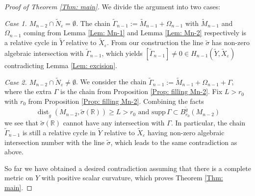 \documentclass[11pt,letterpaper]{amsart}
\numberwithin{equation}{section}
\theoremstyle{definition}
\DeclareMathOperator{\dist}{dist}
\newcommand{\ve}{\varepsilon}
\begin{document}
\begin{proof}[Proof of Theorem \ref{Thm: main}]
We divide the argument into two cases:

\medskip

{\it Case 1. $M_{n-2}\cap \tilde N_\ve=\emptyset$.} The chain $\tilde\Gamma_{n-1}:=\tilde M_{n-1}+\Omega_{n-1}$ with $\tilde M_{n-1}$ and $\Omega_{n-1}$ coming from Lemma \ref{Lem: Mn-1} and Lemma \ref{Lem: Mn-2} respectively is a relative cycle in $\tilde Y$ relative to $\tilde X_\ve$. From our construction the line $\tilde \sigma$ has non-zero algebraic intersection with $\tilde\Gamma_{n-1}$, which yields ${[\tilde\Gamma_{n-1}]}\neq 0\in H_{n-1}(\tilde Y,\tilde X_\ve)$ contradicting Lemma \ref{Lem: excision}.

\medskip
{\it Case 2. $M_{n-2}\cap \tilde N_\ve\neq\emptyset$}. We consider the chain $\tilde \Gamma_{n-1}:=\tilde M_{n-1}+\Omega_{n-1}+\Gamma$, where the extra $\Gamma$ is the chain from Proposition \ref{Prop: filling Mn-2}. Fix $L>r_0$ with $r_0$ from Proposition \ref{Prop: filling Mn-2}. Combining the facts
$$
\dist_{\tilde g}(M_{n-2},\tilde \sigma(\mathbb R))\geq L>r_0\mbox{ and }\mathrm{supp}\,\Gamma\subset B^{\tilde g}_{r_0}(M_{n-2})
$$
we see that $\tilde \sigma(\mathbb R)$ cannot have any intersection with $\Gamma$. In particular, the chain $\tilde \Gamma_{n-1}$ is still a relative cycle in $\tilde Y$ relative to $\tilde X_\ve$ having non-zero algebraic intersection number with the line $\tilde \sigma$, which leads to the same contradiction as above.

\medskip

So far we have obtained a desired contradiction assuming that there is a complete metric on $Y$ with positive scalar curvature, which proves Theorem \ref{Thm: main}.
\end{proof}
\end{document}
